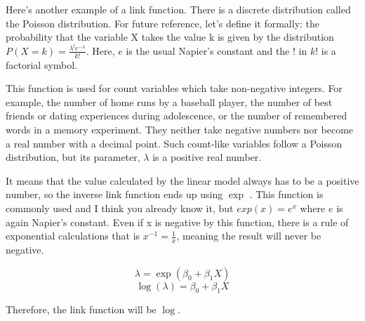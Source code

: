\documentclass{ltjsbook}
\begin{document}
Here's another example of a link function. There is a discrete distribution called the Poisson distribution. For future reference, let's define it formally: the probability that the variable X takes the value k is given by the distribution $P(X=k)=\frac{\lambda^l e^{-\lambda}}{k!}$. Here, $e$ is the usual Napier's constant and the $!$ in $k!$ is a factorial symbol.

This function is used for count variables which take non-negative integers. For example, the number of home runs by a baseball player, the number of best friends or dating experiences during adolescence, or the number of remembered words in a memory experiment. They neither take negative numbers nor become a real number with a decimal point. Such count-like variables follow a Poisson distribution, but its parameter, $\lambda$ is a positive real number.

It means that the value calculated by the linear model always has to be a positive number, so the inverse link function ends up using $\exp$ . This function is commonly used and I think you already know it, but $exp(x)=e^x$ where $e$ is again Napier's constant. Even if x is negative by this function, there is a rule of exponential calculations that is $x^{-1}=\frac{1}{x}$, meaning the result will never be negative.

\[ \lambda = \exp(\beta_0 + \beta_1 X) \]
\[ \log(\lambda) = \beta_0 + \beta_1X \]

Therefore, the link function will be $\log$.
\end{document}
